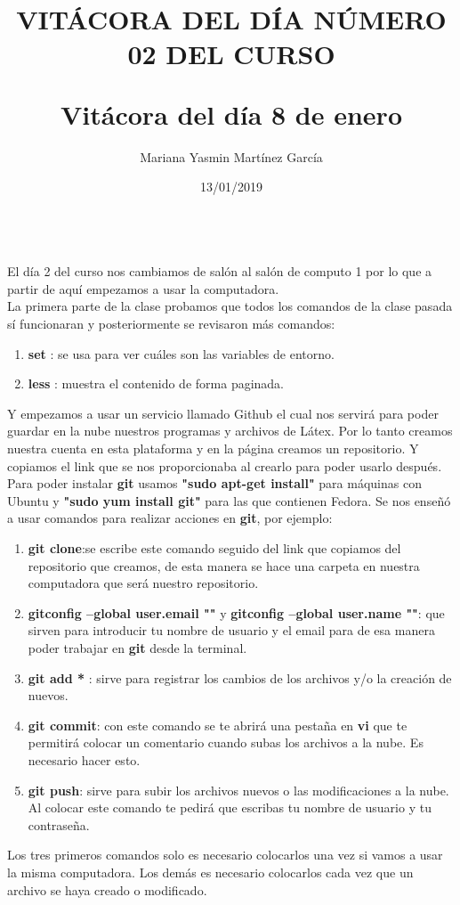 \documentclass[letterpaper, 12pt, twoside]{article}
\title{\Huge\item\color{red}\textbf {VITÁCORA DEL DÍA NÚMERO 02 DEL CURSO}}
\author{Mariana Yasmin Martínez García}
\date{13/01/2019}
\begin{document}
	\maketitle
	
	\newpage
	\title{\huge\textbf{Vitácora del día 8 de enero\\}} \\
	El día 2 del curso nos cambiamos de salón al salón de computo 1 por lo que a partir de aquí empezamos a usar la computadora. \\
	La primera parte de la clase probamos que todos los comandos de la clase pasada sí funcionaran y posteriormente se revisaron más comandos:
	\begin{enumerate}
		\item \textbf{\large set }: se usa para ver cuáles son las variables de entorno.
		\item \textbf{\large less }: muestra el contenido de forma paginada.
		
	\end{enumerate}
    Y empezamos a usar un servicio llamado Github el cual nos servirá para poder guardar en la nube nuestros programas y archivos de Látex.
    Por lo tanto creamos nuestra cuenta en esta plataforma y en la página creamos un repositorio. Y copiamos el link que se nos proporcionaba al crearlo para poder usarlo después. \\
    Para poder instalar \textbf{git} usamos \textbf{"sudo apt-get install"} para máquinas con Ubuntu y \textbf{"sudo yum install git"} para las que contienen Fedora. Se nos enseñó a usar comandos para realizar acciones en \textbf{git}, por ejemplo:
    \begin{enumerate}
    	\item\textbf{\large git clone}:se escribe este comando seguido del link que copiamos del repositorio que creamos, de esta manera se hace una carpeta en nuestra computadora que será nuestro repositorio. 
    	\item\textbf{\large gitconfig --global user.email ""} y \textbf{ \large gitconfig --global user.name ""}: que sirven para introducir tu nombre de usuario y el email para de esa manera poder trabajar en \textbf{git} desde la terminal. \\
    	\item\textbf{\large git add * }: sirve para registrar los cambios de los archivos y/o la creación de nuevos.
    	\item\textbf{\large git commit}: con este comando se te abrirá una pestaña en \textbf{vi} que te permitirá colocar un comentario cuando subas los archivos a la nube. Es necesario hacer esto.
    	\item\textbf{\large git push}: sirve para subir los archivos nuevos o las modificaciones a la nube. Al colocar este comando te pedirá que escribas tu nombre de usuario y tu contraseña.
    \end{enumerate}
 Los tres primeros comandos solo es necesario colocarlos una vez si vamos a usar la misma computadora. Los demás es necesario colocarlos cada vez que un archivo se haya creado o modificado.
\end{document}
